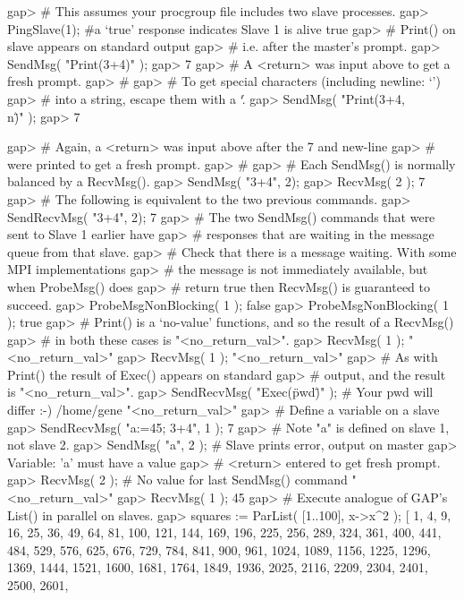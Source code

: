 \beginexample
gap> # This assumes your procgroup file includes two slave processes.
gap> PingSlave(1); #a `true' response indicates Slave 1 is alive
true
gap> # Print() on slave appears on standard output 
gap> # i.e. after the master's prompt.
gap> SendMsg( "Print(3+4)" );
gap> 7
gap> # A <return> was input above to get a fresh prompt.
gap> #
gap> # To get special characters (including newline: `\n')
gap> # into a string, escape them with a `\'.
gap> SendMsg( "Print(3+4,\"\\n\")" );
gap> 7

gap> # Again, a <return> was input above after the 7 and new-line
gap> # were printed to get a fresh prompt.
gap> #
gap> # Each SendMsg() is normally balanced by a RecvMsg().
gap> SendMsg( "3+4", 2);
gap> RecvMsg( 2 );
7
gap> # The following is equivalent to the two previous commands.
gap> SendRecvMsg( "3+4", 2);
7
gap> # The two SendMsg() commands that were sent to Slave 1 earlier have
gap> # responses that are waiting in the message queue from that slave.
gap> # Check that there is a message waiting. With some MPI implementations
gap> # the message is not immediately available, but when ProbeMsg() does
gap> # return true then RecvMsg() is guaranteed to succeed. 
gap> ProbeMsgNonBlocking( 1 );
false
gap> ProbeMsgNonBlocking( 1 );
true
gap> # Print() is a `no-value' functions, and so the result of a RecvMsg() 
gap> # in both these cases is "<no_return_val>".
gap> RecvMsg( 1 );
"<no_return_val>"
gap> RecvMsg( 1 );
"<no_return_val>"
gap> # As with Print() the result of Exec() appears on standard
gap> # output, and the result is "<no_return_val>".
gap> SendRecvMsg( "Exec(\"pwd\")" ); # Your pwd will differ :-)
/home/gene
"<no_return_val>"
gap> # Define a variable on a slave
gap> SendRecvMsg( "a:=45; 3+4", 1 );
7
gap> # Note "a" is defined on slave 1, not slave 2.
gap> SendMsg( "a", 2 ); # Slave prints error, output on master
gap>  Variable: 'a' must have a value
gap> # <return> entered to get fresh prompt.
gap> RecvMsg( 2 ); # No value for last SendMsg() command
"<no_return_val>"
gap> RecvMsg( 1 );
45
gap> # Execute analogue of GAP's List() in parallel on slaves.
gap> squares := ParList( [1..100], x->x^2 );
[ 1, 4, 9, 16, 25, 36, 49, 64, 81, 100, 121, 144, 169, 196, 225, 256, 
  289, 324, 361, 400, 441, 484, 529, 576, 625, 676, 729, 784, 841, 
  900, 961, 1024, 1089, 1156, 1225, 1296, 1369, 1444, 1521, 1600, 
  1681, 1764, 1849, 1936, 2025, 2116, 2209, 2304, 2401, 2500, 2601, 
